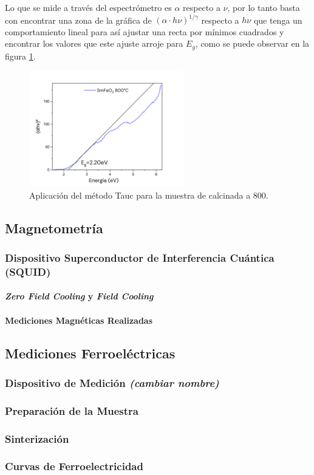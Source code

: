 \documentclass[../main.tex]{subfiles}
\begin{document}
Lo que se mide a través del espectrómetro es $\alpha$ respecto a $\nu$, por lo tanto basta con encontrar una zona de la gráfica de $(\alpha\cdot h\nu)^{1/\gamma}$ respecto a $h\nu$ que tenga un comportamiento lineal para así ajustar una recta por mínimos cuadrados y encontrar los valores que este ajuste arroje para $E_g$, como se puede observar en la figura \ref{fig:ejemplotauc}.
\begin{figure}[H]
    \centering
    \includegraphics[width=0.6\textwidth]{fig/ejemplotauc.png}
    \caption{Aplicación del método Tauc para la muestra de \sama{} calcinada a 800\gradoC.}
    \label{fig:ejemplotauc}
\end{figure}
\subsection{Magnetometría}

\subsubsection{Dispositivo Superconductor de Interferencia Cuántica (SQUID)}

\paragraph{\textit{Zero Field Cooling} y \textit{Field Cooling}}

\paragraph{Mediciones Magnéticas Realizadas}

\subsection*{Mediciones Ferroeléctricas}

\subsubsection{Dispositivo de Medición \textit{(cambiar nombre)}}

\subsubsection{Preparación de la Muestra}

\subsubsection{Sinterización}

\subsubsection{Curvas de Ferroelectricidad}
\end{document}
